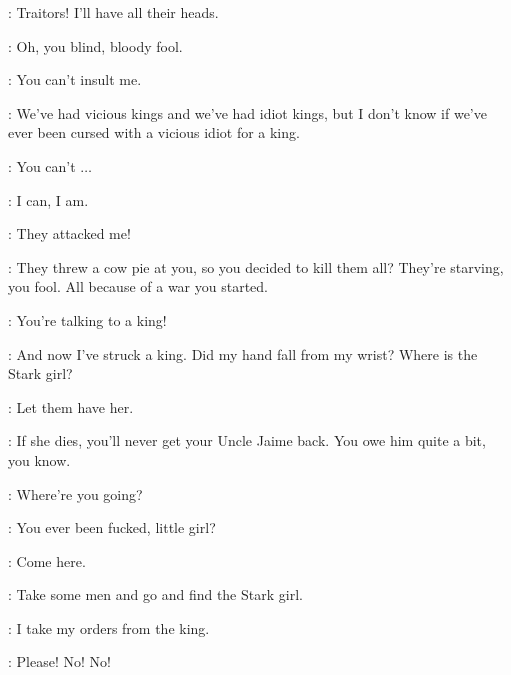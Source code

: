 
\JOFFREY: Traitors!  I'll have all their heads. 

\TYRION: Oh, you blind, bloody fool. 

\JOFFREY: You can't insult me. 

\TYRION: We've had vicious kings and we've had idiot kings, but I don't know if we've ever been cursed with a vicious idiot for a king. 

\JOFFREY: You can't $\ldots$  

\TYRION: I can, I am. 

\JOFFREY: They attacked me! 

\TYRION: They threw a cow pie at you, so you decided to kill them all? They're starving, you fool. All because of a war you started. 

\JOFFREY: You're talking to a king! 


\TYRION: And now I've struck a king. Did my hand fall from my wrist?  Where is the Stark girl? 

\JOFFREY: Let them have her. 

\TYRION: If she dies, you'll never get your Uncle Jaime back. You owe him quite a bit, you know. 


\RIOTERb: Where're you going?


\RIOTERa: You ever been fucked, little girl?

\RIOTERb: Come here.

\TYRION: Take some men and go and find the Stark girl. 

\MERYN: I take my orders from the king.



\SANSA: Please! No! No!


